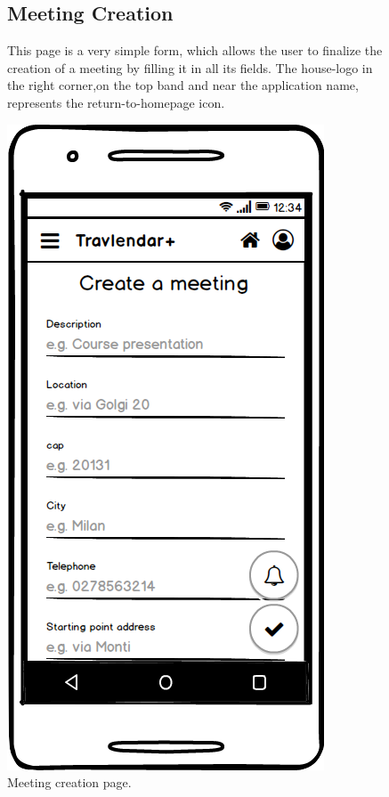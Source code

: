 	\begin{figure}
			\begin{flushleft}
			\subsection{Meeting Creation}
			This page is a very simple form, which allows the user to finalize the creation of a meeting by filling it in all its fields. 
			The house-logo in the  right corner,on the top band and near the application name, represents the return-to-homepage icon. 
		\end{flushleft}
		\centering
		\includegraphics[width=0.6\linewidth]{mockups/CreateMeeting}
		\caption{Meeting creation page.}
		\label{fig:createmeeting}
	\end{figure}

